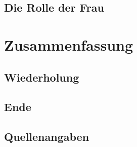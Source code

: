\documentclass[12pt,a4paper,ngerman,openany]{book}
\newcommand{\fchapter}[1]{\chapter{#1}\thispagestyle{chapterstyle}}
\begin{document}
\lipsum[6]

\section{Die Rolle der Frau}

\lipsum[6]

\fchapter{Zusammenfassung}

\section{Wiederholung}

\lipsum[6]

\section{Ende}

\lipsum[6]

\newpage %
\section{Quellenangaben}
\end{document}
